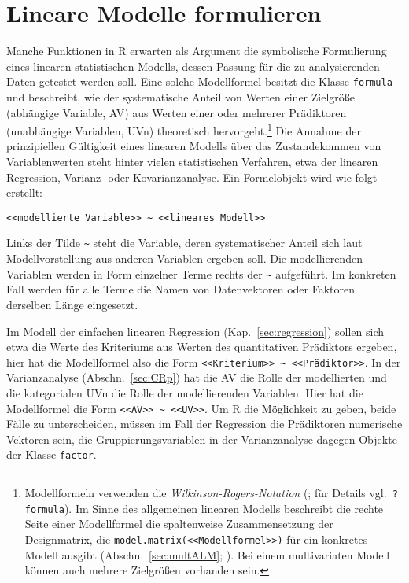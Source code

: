 \section{Lineare Modelle formulieren}
\label{sec:formula}

Manche Funktionen in R erwarten als Argument die symbolische Formulierung eines linearen statistischen Modells, dessen Passung für die zu analysierenden Daten getestet werden soll. Eine solche Modellformel besitzt die Klasse \lstinline!formula! und beschreibt, wie der systematische Anteil von Werten einer Zielgröße (abhängige Variable, AV) aus Werten einer oder mehrerer Prädiktoren (unabhängige Variablen, UVn) theoretisch hervorgeht.\footnote{Modellformeln verwenden die \emph{Wilkinson-Rogers-Notation} (; für Details vgl.\ \lstinline!?formula!). Im Sinne des allgemeinen linearen Modells beschreibt die rechte Seite einer Modellformel die spaltenweise Zusammensetzung der Designmatrix, die \lstinline!model.matrix(<<Modellformel>>)! für ein konkretes Modell ausgibt (Abschn.\ \ref{sec:multALM}; ). Bei einem multivariaten Modell können auch mehrere Zielgrößen vorhanden sein.} Die Annahme der prinzipiellen Gültigkeit eines linearen Modells über das Zustandekommen von Variablenwerten steht hinter vielen statistischen Verfahren, etwa der linearen Regression, Varianz- oder Kovarianzanalyse. Ein Formelobjekt wird wie folgt erstellt:
\begin{lstlisting}
<<modellierte Variable>> ~ <<lineares Modell>>
\end{lstlisting}

Links der Tilde \lstinline!~! steht die Variable, deren systematischer Anteil sich laut Modellvorstellung aus anderen Variablen ergeben soll. Die modellierenden Variablen werden in Form einzelner Terme rechts der \lstinline!~! aufgeführt. Im konkreten Fall werden für alle Terme die Namen von Datenvektoren oder Faktoren derselben Länge eingesetzt.

Im Modell der einfachen linearen Regression (Kap.\ \ref{sec:regression}) sollen sich etwa die Werte des Kriteriums aus Werten des quantitativen Prädiktors ergeben, hier hat die Modellformel also die Form \lstinline!<<Kriterium>> ~ <<Prädiktor>>!. In der Varianzanalyse (Abschn.\ \ref{sec:CRp}) hat die AV die Rolle der modellierten und die kategorialen UVn die Rolle der modellierenden Variablen. Hier hat die Modellformel die Form \lstinline!<<AV>> ~ <<UV>>!. Um R die Möglichkeit zu geben, beide Fälle zu unterscheiden, müssen im Fall der Regression die Prädiktoren numerische Vektoren sein, die Gruppierungsvariablen in der Varianzanalyse dagegen Objekte der Klasse \lstinline!factor!.

